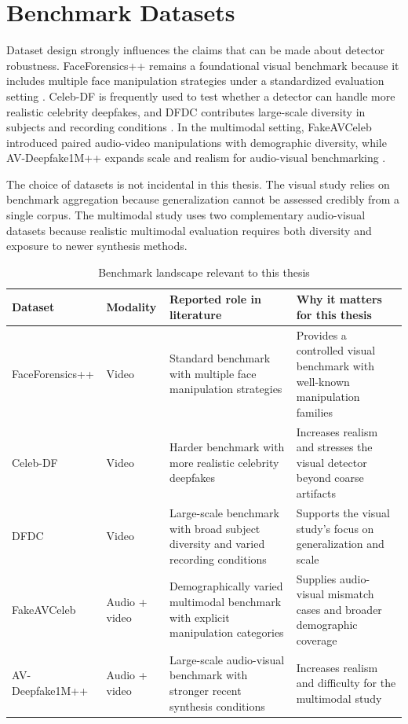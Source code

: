 \section{Benchmark Datasets}

Dataset design strongly influences the claims that can be made about detector robustness. FaceForensics++ remains a foundational visual benchmark because it includes multiple face manipulation strategies under a standardized evaluation setting \cite{roessler2019faceforensicspp}. Celeb-DF is frequently used to test whether a detector can handle more realistic celebrity deepfakes, and DFDC contributes large-scale diversity in subjects and recording conditions \cite{li2020celebdf,dolhansky2020dfdc}. In the multimodal setting, FakeAVCeleb introduced paired audio-video manipulations with demographic diversity, while AV-Deepfake1M++ expands scale and realism for audio-visual benchmarking \cite{Khalid2022,Jung2024}.

The choice of datasets is not incidental in this thesis. The visual study relies on benchmark aggregation because generalization cannot be assessed credibly from a single corpus. The multimodal study uses two complementary audio-visual datasets because realistic multimodal evaluation requires both diversity and exposure to newer synthesis methods.

\begin{table}[H]
\centering
\small
\caption{Benchmark landscape relevant to this thesis}
\label{tab:dataset-landscape}
\begin{tabular}{p{}p{}p{}p{}}
\toprule
\textbf{Dataset} & \textbf{Modality} & \textbf{Reported role in literature} & \textbf{Why it matters for this thesis} \\
\midrule
FaceForensics++ & Video & Standard benchmark with multiple face manipulation strategies \cite{roessler2019faceforensicspp} & Provides a controlled visual benchmark with well-known manipulation families \\
Celeb-DF & Video & Harder benchmark with more realistic celebrity deepfakes \cite{li2020celebdf} & Increases realism and stresses the visual detector beyond coarse artifacts \\
DFDC & Video & Large-scale benchmark with broad subject diversity and varied recording conditions \cite{dolhansky2020dfdc} & Supports the visual study's focus on generalization and scale \\
FakeAVCeleb & Audio + video & Demographically varied multimodal benchmark with explicit manipulation categories \cite{Khalid2022} & Supplies audio-visual mismatch cases and broader demographic coverage \\
AV-Deepfake1M++ & Audio + video & Large-scale audio-visual benchmark with stronger recent synthesis conditions \cite{Jung2024} & Increases realism and difficulty for the multimodal study \\
\bottomrule
\end{tabular}
\end{table}

